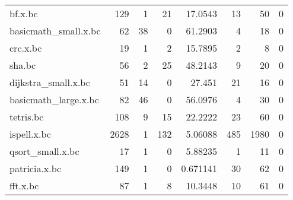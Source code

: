 \begin{tabular}{lrrrrrrr}
 bf.x.bc              &                129 &                     1 &                          21 &              17.0543   &                    13 &                        50 &                             0 \\
 basicmath\_small.x.bc &                 62 &                    38 &                           0 &              61.2903   &                     4 &                        18 &                             0 \\
 crc.x.bc             &                 19 &                     1 &                           2 &              15.7895   &                     2 &                         8 &                             0 \\
 sha.bc               &                 56 &                     2 &                          25 &              48.2143   &                     9 &                        20 &                             0 \\
 dijkstra\_small.x.bc  &                 51 &                    14 &                           0 &              27.451    &                    21 &                        16 &                             0 \\
 basicmath\_large.x.bc &                 82 &                    46 &                           0 &              56.0976   &                     4 &                        30 &                             0 \\
 tetris.bc            &                108 &                     9 &                          15 &              22.2222   &                    23 &                        60 &                             0 \\
 ispell.x.bc          &               2628 &                     1 &                         132 &               5.06088  &                   485 &                      1980 &                             0 \\
 qsort\_small.x.bc     &                 17 &                     1 &                           0 &               5.88235  &                     1 &                        11 &                             0 \\
 patricia.x.bc        &                149 &                     1 &                           0 &               0.671141 &                    30 &                        62 &                             0 \\
 fft.x.bc             &                 87 &                     1 &                           8 &              10.3448   &                    10 &                        61 &                             0 \\

\end{tabular}
